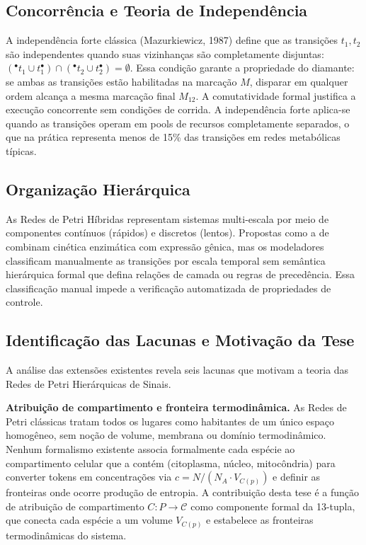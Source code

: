 \subsection{Concorrência e Teoria de Independência}
\label{subsec:concorrencia}

A independência forte clássica (Mazurkiewicz, 1987) define que as transições
$t_1, t_2$ são independentes quando suas vizinhanças são completamente disjuntas:
$({}^\bullet t_1 \cup t_1^\bullet) \cap ({}^\bullet t_2 \cup t_2^\bullet) = \emptyset$.
Essa condição garante a propriedade do diamante: se ambas as transições estão
habilitadas na marcação $M$, disparar em qualquer ordem alcança a mesma marcação
final $M_{12}$. A comutatividade formal justifica a execução concorrente sem
condições de corrida. A independência forte aplica-se quando as transições
operam em pools de recursos completamente separados, o que na prática representa
menos de 15\% das transições em redes metabólicas típicas.

\subsection{Organização Hierárquica}
\label{subsec:hierarquia}

As Redes de Petri Híbridas representam sistemas multi-escala por meio de
componentes contínuos (rápidos) e discretos (lentos). Propostas como a de \textcite{Liu2013} combinam cinética enzimática com expressão gênica, mas
os modeladores classificam manualmente as transições por escala temporal sem
semântica hierárquica formal que defina relações de camada ou regras de
precedência. Essa classificação manual impede a verificação automatizada de
propriedades de controle.

\subsection{Identificação das Lacunas e Motivação da Tese}
\label{subsec:lacunas-id}

A análise das extensões existentes revela seis lacunas que motivam a teoria
das Redes de Petri Hierárquicas de Sinais.

\textbf{Atribuição de compartimento e fronteira termodinâmica.}
As Redes de Petri clássicas tratam todos os lugares como habitantes de um único
espaço homogêneo, sem noção de volume, membrana ou domínio termodinâmico.
Nenhum formalismo existente associa formalmente cada espécie ao compartimento
celular que a contém (citoplasma, núcleo, mitocôndria) para converter tokens
em concentrações via $c = N / (N_A \cdot V_{C(p)})$ e definir as fronteiras
onde ocorre produção de entropia.
A contribuição desta tese é a função de atribuição de compartimento
$C: P \to \mathcal{C}$ como componente formal da 13-tupla, que conecta
cada espécie a um volume $V_{C(p)}$ e estabelece as fronteiras termodinâmicas
do sistema.

